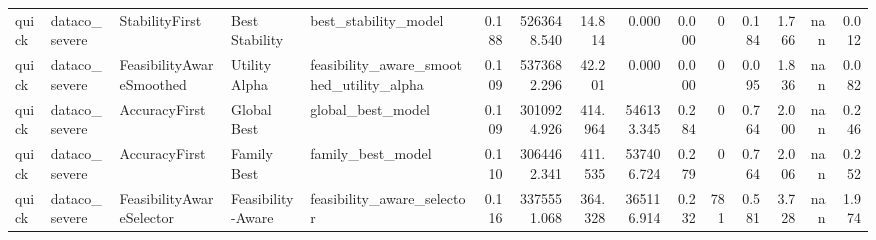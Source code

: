 \begin{table}
{\begin{tabular}{lllllrrrrrrrrrr}
   quick &  dataco\_severe &            StabilityFirst &        Best Stability &                               best\_stability\_model & 0.188 &     5263648.540 &               14.814 &              0.000 &                     0.000 &                   0 &                       0.184 &                  1.766 &               nan &                  0.012 \\
   quick &  dataco\_severe &  FeasibilityAwareSmoothed &         Utility Alpha &           feasibility\_aware\_smoothed\_utility\_alpha & 0.109 &     5373682.296 &               42.201 &              0.000 &                     0.000 &                   0 &                       0.095 &                  1.836 &               nan &                  0.082 \\
   quick &  dataco\_severe &             AccuracyFirst &           Global Best &                                  global\_best\_model & 0.109 &     3010924.926 &              414.964 &         546133.345 &                     0.284 &                   0 &                       0.764 &                  2.000 &               nan &                  0.246 \\
   quick &  dataco\_severe &             AccuracyFirst &           Family Best &                                  family\_best\_model & 0.110 &     3064462.341 &              411.535 &         537406.724 &                     0.279 &                   0 &                       0.764 &                  2.006 &               nan &                  0.252 \\
   quick &  dataco\_severe &  FeasibilityAwareSelector &     Feasibility-Aware &                         feasibility\_aware\_selector & 0.116 &     3375551.068 &              364.328 &         365116.914 &                     0.232 &                 781 &                       0.581 &                  3.728 &               nan &                  1.974 \\
\bottomrule
\end{tabular}
}

\end{table}

